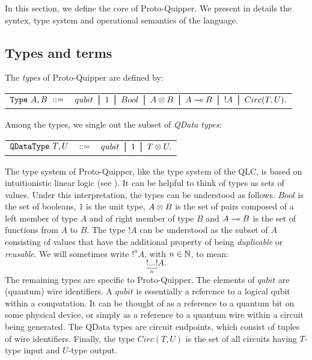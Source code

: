 \documentclass{article}
\begin{document}
In this section, we define the core of Proto-Quipper. We 
present in details the syntex, type system and 
operational semantics of the language.

\subsection{Types and terms}
\label{ssec-types-and-terms}

\begin{definition} 
The \emph{types} of Proto-Quipper are defined by:
\begin{center}
\begin{tabular}{rl}
$\texttt{Type}~A,B~::=$ & $ qubit \bor 1 \bor Bool \bor A\tensor B \bor 
A\loli B \bor !A \bor Circ (T,U).$\\
\end{tabular}
\end{center}
Among the types, we single out the subset of \emph{QData types}:
\begin{center}
\begin{tabular}{rcl}
$\texttt{QDataType}~T,U$ & $::=$ & $qubit \bor 1 \bor T \tensor U.$
\end{tabular}
\end{center}
\end{definition}

The type system of Proto-Quipper, like the type system of the QLC, 
is based on intuitionistic linear logic (see \cite{Gir87}). 
It can be helpful to think of types as sets of values. Under this 
interpretation, the types can be understood as follows. $Bool$ is 
the set of booleans, $1$ is the unit type, $A\otimes B$ is the set of 
pairs composed of a left member of type $A$ and of right member 
of type $B$ and $A\multimap B$ is the set of functions from $A$ to 
$B$. The type $!A$ can be understood as the subset of $A$ 
consisting of values that have the additional property of being 
\emph{duplicable} or \emph{reusable}. We will sometimes write 
$!^nA$, with $n\in\mathbb{N}$, to mean: 
\[
\underbrace{!\ldots !}_{n} A.
\]
The remaining types are specific to Proto-Quipper. The elements 
of $qubit$ are (quantum) wire identifiers. A $qubit$ is essentially 
a reference to a  logical qubit within a computation. It can be 
thought of as a reference to a quantum bit on some physical device, 
or simply as a  reference to a quantum wire within a circuit being 
generated. The QData types are circuit endpoints, which consist of 
tuples of wire identifiers. Finally, the type $Circ(T,U)$ is the 
set of all circuits having $T$-type input and $U$-type output. 
\end{document}
